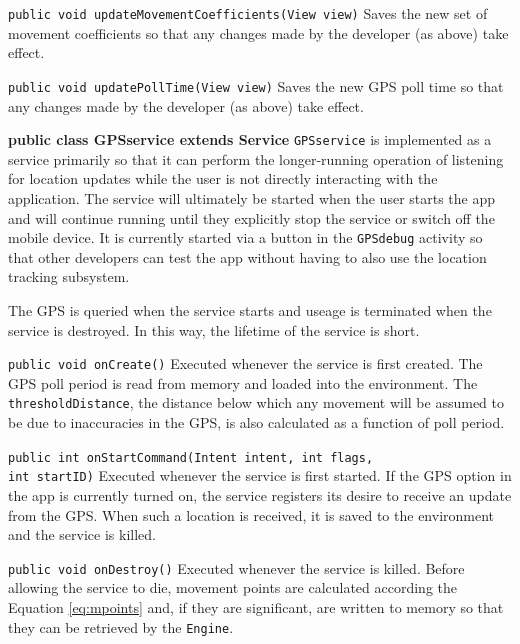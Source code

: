 \documentclass[12pt,a4paper,twoside]{article}
\begin{document}
\verb=public void updateMovementCoefficients(View view)=\newline
Saves the new set of movement coefficients so that any changes made by the developer (as above) take effect.

\verb=public void updatePollTime(View view)=\newline
Saves the new GPS poll time so that any changes made by the developer (as above) take effect.

\large{\textbf{public class GPSservice extends Service}}\newline
\verb=GPSservice= is implemented as a service primarily so that it can perform the longer-running operation of listening for location updates while the user is not directly interacting with the application. The service will ultimately be started when the user starts the app and will continue running until they explicitly stop the service or switch off the mobile device. It is currently started via a button in the \verb=GPSdebug= activity so that other developers can test the app without having to also use the location tracking subsystem.

The GPS is queried when the service starts and useage is terminated when the service is destroyed. In this way, the lifetime of the service is short.

\verb=public void onCreate()=\newline
Executed whenever the service is first created. The GPS poll period is read from memory and loaded into the environment. The \verb=thresholdDistance=, the distance below which any movement will be assumed to be due to inaccuracies in the GPS, is also calculated as a function of poll period.

\verb=public int onStartCommand(Intent intent, int flags,=\newline
\verb=                          int startID)=\newline
Executed whenever the service is first started. If the GPS option in the app is currently turned on, the service registers its desire to receive an update from the GPS. When such a location is received, it is saved to the environment and the service is killed.

\verb=public void onDestroy()=\newline
Executed whenever the service is killed. Before allowing the service to die, movement points are calculated according the Equation \ref{eq:mpoints} and, if they are significant, are written to memory so that they can be retrieved by the \verb=Engine=.
\end{document}
